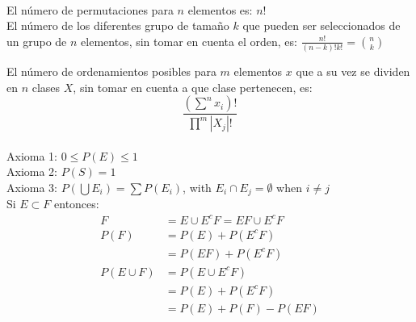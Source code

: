 \\[0.1cm]

El número de permutaciones para $n$ elementos es: $n!$\\

El número de los diferentes grupo de tamaño $k$ que pueden ser seleccionados de un grupo de $n$ elementos, sin tomar en cuenta el orden, es: 
$\frac{n!}{(n-k)!k!} = \binom{n}{k}$

El número de ordenamientos posibles para $m$ elementos $x$ que a su vez se dividen en $n$ clases $X$, sin tomar en cuenta a que clase pertenecen, es: 
\begin{equation*}\frac{(\sum^n x_i)!}{\prod^m |X_j|!}\end{equation*}
\\[0.1cm]

Axioma 1: $0 \leq P(E) \leq 1$\\
Axioma 2: $P(S)=1$\\
Axioma 3: $P\left(\bigcup E_i \right) =  \sum P\left(E_i\right)$, with $E_i \cap E_j = \emptyset$ when $i\neq j$\\[0.5cm]


Si $E \subset F$ entonces:\\
\begin{align*}
F &= E \cup E^c F = EF \cup E^c F\\
P(F) &= P(E) + P(E^c F)\\
&= P(EF) + P(E^c F)\\
P(E\cup F) &= P(E\cup E^c F)\\
&= P(E) + P(E^c F)\\
&= P(E) + P(F) - P(EF)
\end{align*}
